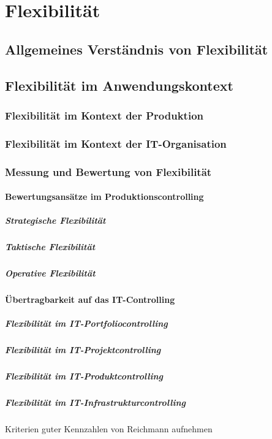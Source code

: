 \section{Flexibilit\"at}
\subsection{Allgemeines Verst\"andnis von Flexibilit\"at}
\subsection{Flexibilit\"at im Anwendungskontext}
\subsubsection{Flexibilit\"at im Kontext der Produktion}
\subsubsection{Flexibilit\"at im Kontext der IT-Organisation}
\subsubsection{Messung und Bewertung von Flexibilit\"at}
\paragraph{Bewertungsans\"atze im Produktionscontrolling}
\subparagraph{Strategische Flexibilit\"at}
\subparagraph{Taktische Flexibilit\"at}
\subparagraph{Operative Flexibilit\"at}
\paragraph{\"Ubertragbarkeit auf das IT-Controlling}
\subparagraph{Flexibilit\"at im IT-Portfoliocontrolling}
\subparagraph{Flexibilit\"at im IT-Projektcontrolling}
\subparagraph{Flexibilit\"at im IT-Produktcontrolling}
\subparagraph{Flexibilit\"at im IT-Infrastrukturcontrolling}
Kriterien guter Kennzahlen von Reichmann aufnehmen